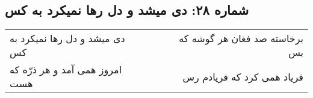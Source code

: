 \begin{center}
\section*{شماره ۲۸: دی میشد و دل رها نمیکرد به کس}
\label{sec:028}
\begin{longtable}{l p{0.5cm} r}
دی میشد و دل رها نمیکرد به کس
&&
برخاسته صد فغان هر گوشه که بس
\\
امروز همی آمد و هر ذرّه که هست
&&
فریاد همی کرد که فریادم رس
\\
\end{longtable}
\end{center}
